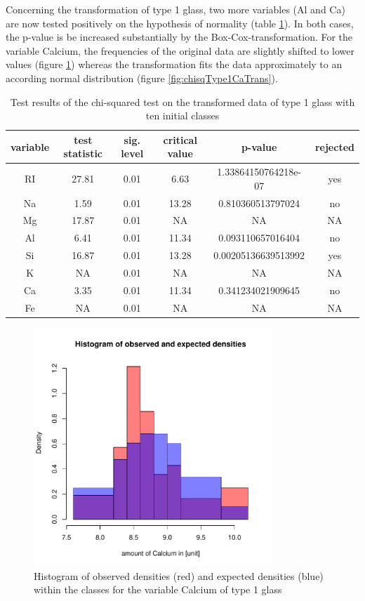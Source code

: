 \documentclass[a4paper, 12pt, titlepage, headsepline, listof = totoc, bibliography = totoc, numbers = noenddot]{scrartcl}
\begin{document}
Concerning the transformation of type 1 glass, two more variables (Al and Ca) are now tested positively on the hypothesis of normality (table \ref{tab:chi-type1-trans}). In both cases, the p-value is be increased substantially by the Box-Cox-transformation. For the variable Calcium, the frequencies of the original data are slightly shifted to lower values (figure \ref{fig:chisqType1Ca}) whereas the transformation fits the data approximately to an according normal distribution (figure \ref{fig:chisqType1CaTrans}).

\begin{table}[h!]
\centering
\begin{tabular}{|cccccc|} \hline variable & test statistic & sig. level & critical value & p-value & rejected\\ \hline RI & 27.81 & 0.01 & 6.63 & 1.33864150764218e-07 & yes\\ 
Na & 1.59 & 0.01 & 13.28 & 0.810360513797024 & no\\ 
Mg & 17.87 & 0.01 & NA & NA & NA\\ 
Al & 6.41 & 0.01 & 11.34 & 0.093110657016404 & no\\ 
Si & 16.87 & 0.01 & 13.28 & 0.00205136639513992 & yes\\ 
K & NA & 0.01 & NA & NA & NA\\ 
Ca & 3.35 & 0.01 & 11.34 & 0.341234021909645 & no\\ 
Fe & NA & 0.01 & NA & NA & NA\\ \hline \end{tabular}\caption{Test results of the chi-squared test on the transformed data of type 1 glass with ten initial classes}
\label{tab:chi-type1-trans}
\end{table}



\begin{figure}[h!]
\centering
\includegraphics[width=0.8\textwidth]{report-chisqType1Ca}
\caption{Histogram of observed densities (red) and expected densities (blue) within the classes for the variable Calcium of type 1 glass}
\label{fig:chisqType1Ca}
\end{figure}
\end{document}
